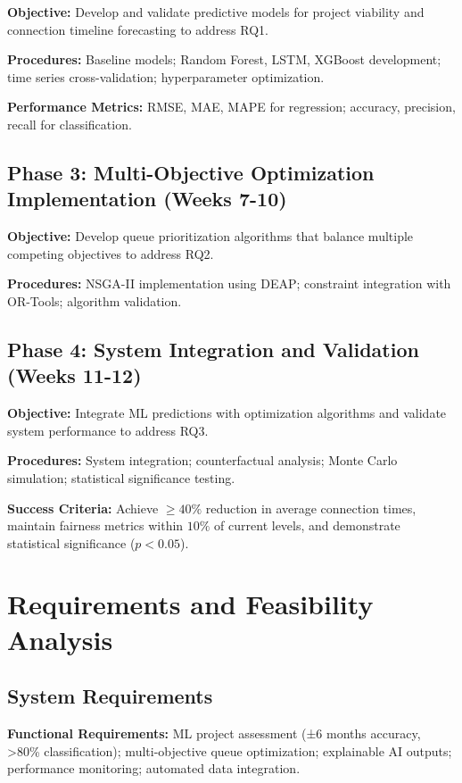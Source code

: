 \documentclass[12pt,a4paper]{article}
\begin{document}
\textbf{Objective:} Develop and validate predictive models for project viability and connection timeline forecasting to address RQ1.

\textbf{Procedures:} Baseline models; Random Forest, LSTM, XGBoost development; time series cross-validation; hyperparameter optimization.

\textbf{Performance Metrics:} RMSE, MAE, MAPE for regression; accuracy, precision, recall for classification.

\subsection{Phase 3: Multi-Objective Optimization Implementation (Weeks 7-10)}

\textbf{Objective:} Develop queue prioritization algorithms that balance multiple competing objectives to address RQ2.

\textbf{Procedures:} NSGA-II implementation using DEAP; constraint integration with OR-Tools; algorithm validation.



\subsection{Phase 4: System Integration and Validation (Weeks 11-12)}

\textbf{Objective:} Integrate ML predictions with optimization algorithms and validate system performance to address RQ3.

\textbf{Procedures:} System integration; counterfactual analysis; Monte Carlo simulation; statistical significance testing.

\textbf{Success Criteria:} Achieve $\geq 40\%$ reduction in average connection times, maintain fairness metrics within $10\%$ of current levels, and demonstrate statistical significance ($p < 0.05$).

\section{Requirements and Feasibility Analysis}
\label{sec:req}

\subsection{System Requirements}

\textbf{Functional Requirements:} ML project assessment (±6 months accuracy, >80\% classification); multi-objective queue optimization; explainable AI outputs; performance monitoring; automated data integration.
\end{document}
